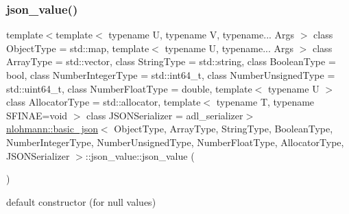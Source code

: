 \subsubsection{\texorpdfstring{json\+\_\+value()}{json\_value()}\hspace{0.1cm}{\footnotesize\ttfamily [1/12]}}
{\footnotesize\ttfamily template$<$template$<$ typename U, typename V, typename... Args $>$ class Object\+Type = std\+::map, template$<$ typename U, typename... Args $>$ class Array\+Type = std\+::vector, class String\+Type  = std\+::string, class Boolean\+Type  = bool, class Number\+Integer\+Type  = std\+::int64\+\_\+t, class Number\+Unsigned\+Type  = std\+::uint64\+\_\+t, class Number\+Float\+Type  = double, template$<$ typename U $>$ class Allocator\+Type = std\+::allocator, template$<$ typename T, typename S\+F\+I\+N\+A\+E=void $>$ class J\+S\+O\+N\+Serializer = adl\+\_\+serializer$>$ \\
\hyperlink{classnlohmann_1_1basic__json}{nlohmann\+::basic\+\_\+json}$<$ Object\+Type, Array\+Type, String\+Type, Boolean\+Type, Number\+Integer\+Type, Number\+Unsigned\+Type, Number\+Float\+Type, Allocator\+Type, J\+S\+O\+N\+Serializer $>$\+::json\+\_\+value\+::json\+\_\+value (\begin{DoxyParamCaption}{ }\end{DoxyParamCaption})\hspace{0.3cm}{\ttfamily [default]}}



default constructor (for null values) 

\mbox{\label{unionnlohmann_1_1basic__json_1_1json__value_a2538617eb31ab405a3d4dd7b4a824654}} 
